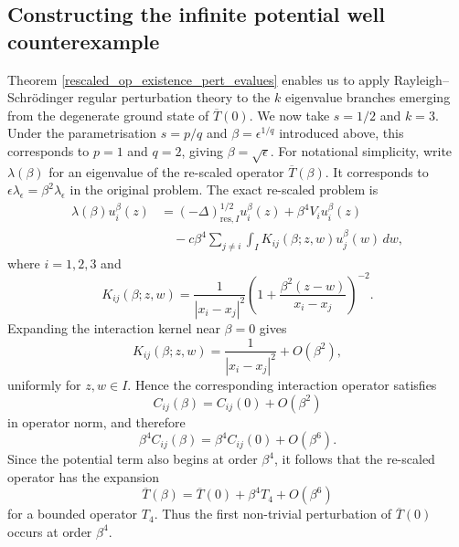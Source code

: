 \documentclass[preprint,12pt]{elsarticle}
\begin{document}
\subsection{Constructing the infinite potential well counterexample}\label{reg_pert_calc_s_half}
Theorem \ref{rescaled_op_existence_pert_evalues} enables us to apply
Rayleigh--Schr\"{o}dinger regular perturbation theory to the $k$
eigenvalue branches emerging from the degenerate ground state of
$\overline{T}(0)$. We now take $s=1/2$ and $k=3$. Under the parametrisation
$s=p/q$ and $\beta=\epsilon^{1/q}$ introduced above, this corresponds to $p=1$ and $q=2$, giving $\beta=\sqrt{\epsilon}$. 
For notational simplicity, write $\lambda(\beta)$ for an eigenvalue
of the re-scaled operator $\overline{T}(\beta)$. It corresponds to
$\epsilon\lambda_\epsilon=\beta^2\lambda_\epsilon$ in the original
problem. The exact re-scaled problem is
\begin{align}\label{rescaled_evalue_problem_k_3}
 \lambda(\beta)u_i^\beta(z)
 &=(-\Delta)^{1/2}_{\mathrm{res},I}u_i^\beta(z)
   +\beta^4V_iu_i^\beta(z)\nonumber\\
 &\quad-c\beta^4\sum_{j\neq i}\int_I
 K_{ij}(\beta;z,w)u_j^\beta(w)\,dw,
\end{align}
where $i=1,2,3$ and
\[
 K_{ij}(\beta;z,w)
 =\frac{1}{|x_i-x_j|^2}
  \left(1+\frac{\beta^2(z-w)}{x_i-x_j}\right)^{-2}.
\]
Expanding the interaction kernel near $\beta=0$ gives
\[
    K_{ij}(\beta;z,w)
    =\frac{1}{|x_i-x_j|^2}+O(\beta^2),
\]
uniformly for $z,w\in I$. Hence the corresponding interaction
operator satisfies
\[
    C_{ij}(\beta)=C_{ij}(0)+O(\beta^2)
\]
in operator norm, and therefore
\[
    \beta^4 C_{ij}(\beta)
    =
    \beta^4 C_{ij}(0)+O(\beta^6).
\]
Since the potential term also begins at order $\beta^4$, it follows
that the re-scaled operator has the expansion
\[
    \overline{T}(\beta)
    =
    \overline{T}(0)+\beta^4T_4+O(\beta^6)
\]
for a bounded operator $T_4$. Thus the first non-trivial perturbation
of $\overline{T}(0)$ occurs at order $\beta^4$.
\end{document}
